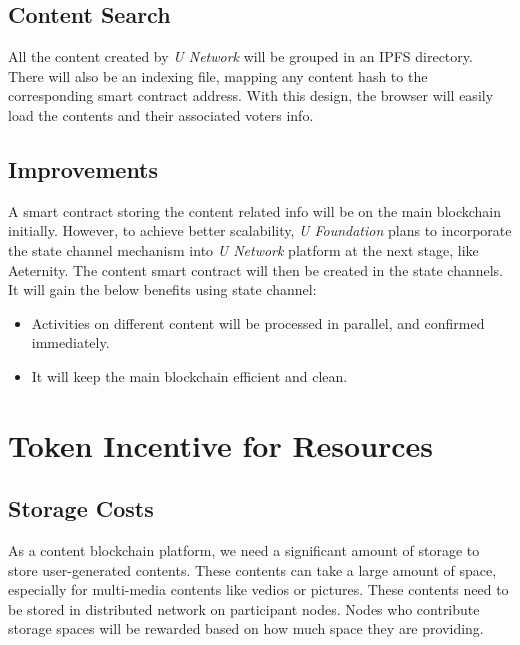\subsection{Content Search}

All the content created by \emph{U Network} will be grouped in an IPFS directory. There will also be an indexing file, mapping any content hash to the corresponding smart contract address. With this design, the browser will easily load the contents and their associated voters info. 

\subsection{Improvements}

A smart contract storing the content related info will be on the main blockchain initially. However, to achieve better scalability, \emph{U Foundation} plans to incorporate the state channel mechanism into \emph{U Network} platform at the next stage, like Aeternity. The content smart contract will then be created in the state channels. It will gain the below benefits using state channel:
\begin{itemize}
\item Activities on different content will be processed in parallel, and confirmed immediately.
\item It will keep the main blockchain efficient and clean.
\end{itemize}


\section{Token Incentive for Resources}


\subsection{Storage Costs}
As a content blockchain platform, we need a significant amount of storage to store user-generated contents. These contents can take a large amount of space, especially for multi-media contents like vedios or pictures. These contents need to be stored in distributed network on participant nodes. Nodes who contribute storage spaces will be rewarded based on how much space they are providing.

